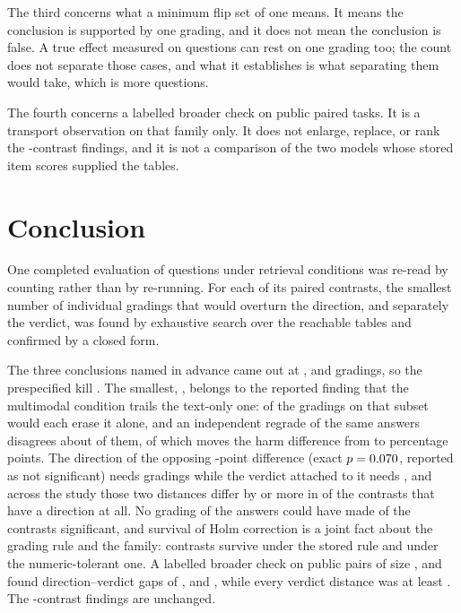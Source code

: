 The third concerns what a minimum flip set of one means. It means the
conclusion is supported by one grading, and it does not mean the conclusion is
false. A true effect measured on \SubsetNWord{} questions can rest on one
grading too; the count does not separate those cases, and what it establishes
is what separating them would take, which is more questions.

The fourth concerns a labelled broader check on \SecondEvalN{} public paired
tasks. It is a transport observation on that family only. It does not
enlarge, replace, or rank the \Contrasts{}-contrast findings, and it is
not a comparison of the two models whose stored item scores supplied
the tables.

\section{Conclusion}

One completed evaluation of \Questions{} questions under \ConditionsWord{} retrieval
conditions was re-read by counting rather than by re-running. For each of its
\Contrasts{} paired contrasts, the smallest number of individual gradings that
would overturn the direction, and separately the verdict, was found by
exhaustive search over the reachable tables and confirmed by a closed form.

The three conclusions named in advance came out at \HarmK{}, \HelpK{} and
\SigK{} gradings, so the prespecified kill \KillState{}. The smallest,
\SmallestK{}, belongs to the reported finding that the multimodal condition
trails the text-only one: \HarmCandidates{} of the \HarmGradings{} gradings on
that subset would each erase it alone, and an independent regrade of the same
answers disagrees about \RegradeContested{} of them, \RegradeImageFlip{} of which moves the
harm difference from \HarmDiff{} to \RegradedDiff{} percentage points. The
direction of the opposing
\HelpDiff{}-point difference (exact \(p=0.070{}\), reported as not significant)
needs \HelpK{} gradings while the verdict attached to it needs \HelpVerdictK{},
and across the study those two distances differ by
\DecoupledGap{} or more in \DecoupledCount{} of the \Directional{} contrasts
that have a direction at all. No grading of the answers could have made
\Incapable{} of the contrasts significant, and survival of Holm correction is a
joint fact about the grading rule and the family: \SurvivesHolm{} contrasts
survive under the stored rule and \NumericHolmSurvivors{} under the
numeric-tolerant one.
A labelled broader check on \SecondEvalN{} public pairs of size
\SecondEvalNArc{}, \SecondEvalNGsm{} and \SecondEvalNWino{} found
direction--verdict gaps of \SecondEvalGapArc{}, \SecondEvalGapGsm{}
and \SecondEvalGapWino{}, while every verdict distance was at least
\SecondEvalKappaVerMin{}. The \Contrasts{}-contrast findings are
unchanged.

